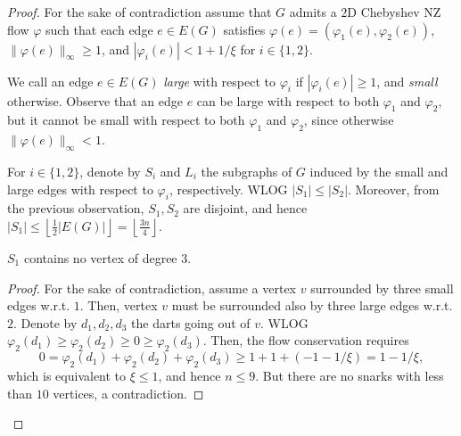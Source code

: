 \begin{proof}
    
    For the sake of contradiction assume that $G$ admits a $2$D Chebyshev NZ flow $\varphi$ such that each edge $e \in E(G)$ satisfies $\varphi(e) = (\varphi_1(e), \varphi_2(e))$, $\|\varphi(e)\|_\infty\geq 1$, and $|\varphi_i(e)|<1+1/\xi$ for $i\in\{1, 2\}$.

    We call an edge $e \in E(G)$ \emph{large} with respect to $\varphi_i$ if $|\varphi_i(e)|\geq 1$, and \emph{small} otherwise. Observe that an edge $e$ can be large with respect to both $\varphi_1$ and $\varphi_2$, but it cannot be small with respect to both $\varphi_1$ and $\varphi_2$, since otherwise $\|\varphi(e)\|_\infty<1$.

    For $i\in\{1, 2\}$, denote by $S_i$ and $L_i$ the subgraphs of $G$ induced by the small and large edges with respect to $\varphi_i$, respectively. WLOG $|S_1| \leq |S_2|$. Moreover, from the previous observation, $S_1, S_2$ are disjoint, and hence $|S_1|\leq\left\lfloor\frac{1}{2}|E(G)|\right\rfloor=\left\lfloor\frac{3n}4\right\rfloor$.
    
    \renewcommand{\qedsymbol}{$\blacksquare$}
    \begin{claim}
        $S_1$ contains no vertex of degree $3$. \label{clm:structure}
    \end{claim}
    \begin{proof}
        For the sake of contradiction, assume a vertex $v$ surrounded by three small edges w.r.t. $1$. Then, vertex $v$ must be surrounded also by three large edges w.r.t. $2$. Denote by $d_1, d_2, d_3$ the darts going out of $v$. WLOG $\varphi_{2}(d_1)\geq \varphi_{2}(d_2)\geq 0\geq\varphi_{2}(d_3)$. Then, the flow conservation requires
        \begin{equation*}
            0 = \varphi_2(d_1) + \varphi_2(d_2) + \varphi_2(d_3) \geq 1 + 1 + (-1-1/\xi) = 1-1/\xi,
        \end{equation*}
        which is equivalent to $\xi\leq 1$, and hence $n\leq 9$. But there are no snarks with less than $10$ vertices, a contradiction.
    \end{proof}


\end{proof}

